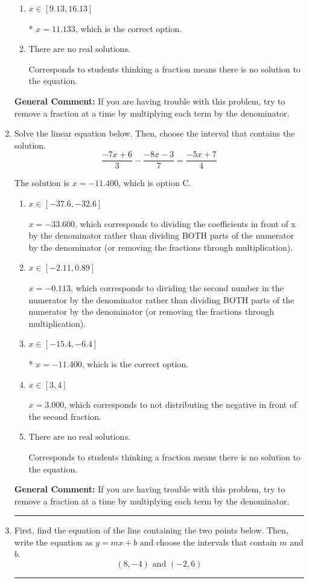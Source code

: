 \documentclass{extbook}[14pt]
\newcommand{\litem}[1]{\item #1

\rule{\textwidth}{0.4pt}}
\begin{document}
\begin{enumerate}
{\begin{enumerate}[label=\Alph*.]
 $x = 0.663$, which corresponds to dividing the second number in the numerator by the denominator rather than dividing BOTH parts of the numerator by the denominator (or removing the fractions through multiplication).
\item \( x \in [9.13, 16.13] \)

* $x = 11.133$, which is the correct option.
\item \( \text{There are no real solutions.} \)

Corresponds to students thinking a fraction means there is no solution to the equation.
\end{enumerate}

\textbf{General Comment:} If you are having trouble with this problem, try to remove a fraction at a time by multiplying each term by the denominator.
}
\litem{
Solve the linear equation below. Then, choose the interval that contains the solution.
\[ \frac{-7x + 6}{3} - \frac{-8x -3}{7} = \frac{-5x + 7}{4} \]

The solution is \( x = -11.400 \), which is option C.\begin{enumerate}[label=\Alph*.]
\item \( x \in [-37.6, -32.6] \)

 $x = -33.600$, which corresponds to dividing the coefficients in front of x by the denominator rather than dividing BOTH parts of the numerator by the denominator (or removing the fractions through multiplication).
\item \( x \in [-2.11, 0.89] \)

 $x = -0.113$, which corresponds to dividing the second number in the numerator by the denominator rather than dividing BOTH parts of the numerator by the denominator (or removing the fractions through multiplication).
\item \( x \in [-15.4, -6.4] \)

* $x = -11.400$, which is the correct option.
\item \( x \in [3, 4] \)

 $x = 3.000$, which corresponds to not distributing the negative in front of the second fraction.
\item \( \text{There are no real solutions.} \)

Corresponds to students thinking a fraction means there is no solution to the equation.
\end{enumerate}

\textbf{General Comment:} If you are having trouble with this problem, try to remove a fraction at a time by multiplying each term by the denominator.
}
\litem{
First, find the equation of the line containing the two points below. Then, write the equation as $ y=mx+b $ and choose the intervals that contain $m$ and $b$.
\[ (8, -4) \text{ and } (-2, 6) \]

}
\end{enumerate}
\end{document}

